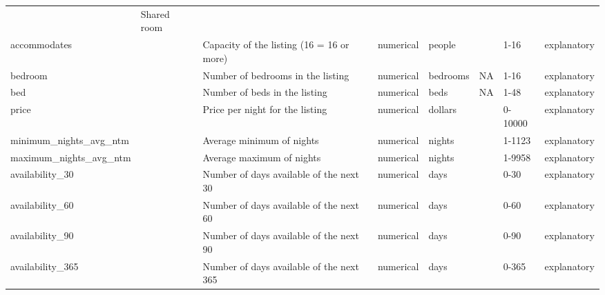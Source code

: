 \begin{center}
\begin{xltabular}{\textwidth}{llXlllll}
                            & Shared room                 &                                   &             &                &                             &                     &  \\
accommodates                 &                             & Capacity of the listing (16 = 16 or more) & numerical   & people         &                             &                     1-16    & explanatory \\
bedroom                     &                             & Number of bedrooms in the listing                           & numerical   & bedrooms       & NA                          &                     1-16    & explanatory \\
bed                         &                             & Number of beds in the listing                           & numerical   & beds           & NA                          &                     1-48    & explanatory \\
price                       &                             & Price per night for the listing                           & numerical   & dollars        &                             &                     0-10000 & explanatory \\
minimum\_nights\_avg\_ntm &                             & Average minimum of nights & numerical   & nights         &                             &                     1-1123  & explanatory \\
maximum\_nights\_avg\_ntm &                             & Average maximum of nights & numerical   & nights         &                             &                     1-9958  & explanatory \\
availability\_30            &                             & Number of days available of the next 30 & numerical   & days           &                             &                     0-30    & explanatory \\
availability\_60            &                             &  Number of days available of the next 60 & numerical   & days           &                             &                     0-60    & explanatory \\
availability\_90            &                             &  Number of days available of the next 90  & numerical   & days           &                             &                     0-90    & explanatory \\
availability\_365           &                             &  Number of days available of the next 365  & numerical   & days           &                             &                     0-365   & explanatory \\

\end{xltabular}
\end{center}
